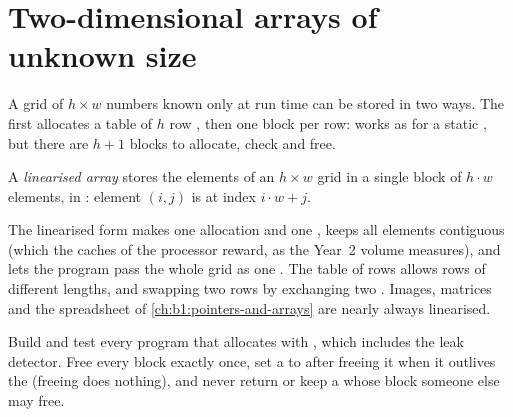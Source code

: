 \section{Two-dimensional arrays of unknown size}\label{sec:b1:dynamic-memory:grids}

A grid of $h \times w$ numbers known only at run time can be stored in two ways. The first allocates a table of $h$
row , then one block per row:  works as for a static , but there are $h + 1$ blocks to
allocate, check and free.

\label{lst:b1:dynamic-memory:rows}


\begin{definition}\label{def:b1:dynamic-memory:linearised}
A \emph{linearised array} stores the elements of an $h \times w$ grid in a single block of
$h \cdot w$ elements, in : element $(i, j)$ is at index $i \cdot w + j$.
\end{definition}

\label{lst:b1:dynamic-memory:flat}


The linearised form makes one allocation and one , keeps all elements contiguous (which the caches of the
processor reward, as the Year~2 volume measures), and lets the program pass the whole grid as one . The table of
rows allows rows of different lengths, and swapping two rows by exchanging two . Images, matrices and the
spreadsheet of \cref{ch:b1:pointers-and-arrays} are nearly always linearised.

\begin{safety}
Build and test every program that allocates with , which includes the leak detector. Free
every block exactly once, set a  to  after freeing it when it outlives the  (freeing
 does nothing), and never return or keep a  whose block someone else may free.
\end{safety}

